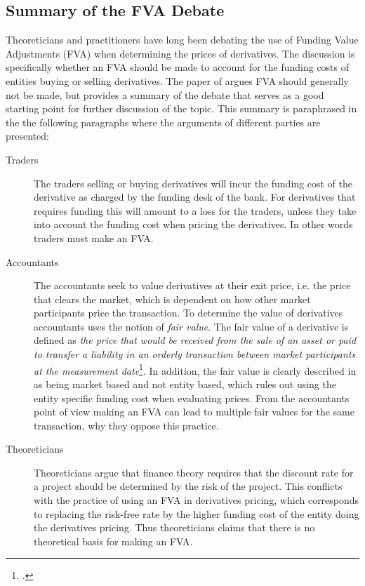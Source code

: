 \documentclass[../main.tex]{subfiles}
\begin{document}
    \subsection{Summary of the FVA Debate}
        Theoreticians and practitioners have long been debating the use of Funding Value Adjustments (FVA) when determining the prices of derivatives.
        The discussion is specifically whether an FVA should be made to account for the funding costs of entities buying or selling derivatives.
        The paper of \cite{HullWhiteFVA} argues FVA should generally not be made,
        but provides a summary of the debate that serves as a good starting point for further discussion of the topic.
        This summary is paraphrased in the the following paragraphs where the arguments of different parties are presented:

        \begin{description}
            \item[Traders] The traders selling or buying derivatives will incur the funding cost of the derivative as charged by the funding desk of the bank.
            For derivatives that requires funding this will amount to a loss for the traders,
            unless they take into account the funding cost when pricing the derivatives.
            In other words traders must make an FVA. 
            \item[Accountants] The accountants seek to value derivatives at their exit price, i.e. the price that clears the market,
            which is dependent on how other market participants price the transaction.
            To determine the value of derivatives accountants uses the notion of \textit{fair value}.
            The fair value of a derivative is defined as \textit{the price that would be received from the sale of an asset or paid to transfer a liability in an orderly transaction between market participants at the measurement date}\footcite{IFRS13}.
            In addition, the fair value is clearly described in \cite{IFRS13} as being market based and not entity based,
            which rules out using the entity specific funding cost when evaluating prices.
            From the accountants point of view making an FVA can lead to multiple fair values for the same transaction,
            why they oppose this practice.
            \item[Theoreticians] Theoreticians argue that finance theory requires that the discount rate for a project should be determined by the risk of the project.
            This conflicts with the practice of using an FVA in derivatives pricing,
            which corresponds to replacing the risk-free rate by the higher funding cost of the entity doing the derivatives pricing.
            Thus theoreticians claims that there is no theoretical basis for making an FVA.
        \end{description}
\end{document}

